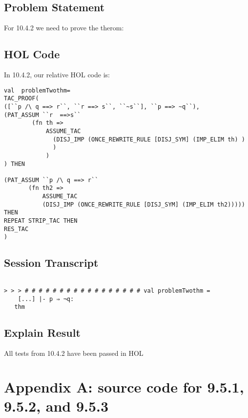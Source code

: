 \documentclass{report}
\begin{document}
\section{Problem Statement}
\label{Problem State 1042}
For 10.4.2 we need to prove the therom:




\section{HOL Code}
\label{HOl Code 1042}
In 10.4.2, our relative HOL code is:
\begin{lstlisting}[frame=trBL]
val  problemTwothm=
TAC_PROOF(
([``p /\ q ==> r``, ``r ==> s``, ``~s``], ``p ==> ~q``),
(PAT_ASSUM ``r  ==>s``
	    (fn th =>
     	    ASSUME_TAC
     	      (DISJ_IMP (ONCE_REWRITE_RULE [DISJ_SYM] (IMP_ELIM th) )
              )
            )
) THEN

(PAT_ASSUM ``p /\ q ==> r``
	   (fn th2 =>
     	   ASSUME_TAC
     	   (DISJ_IMP (ONCE_REWRITE_RULE [DISJ_SYM] (IMP_ELIM th2))))) THEN
REPEAT STRIP_TAC THEN
RES_TAC
)
\end{lstlisting}

\section{Session Transcript}
\label{Session Trans 1041}
\setcounter{sessioncount}{0}
\begin{session}
  \begin{scriptsize}
\begin{verbatim}

> > > # # # # # # # # # # # # # # # # # val problemTwothm =
    [...] |- p ⇒ ¬q:
   thm
\end{verbatim}
  \end{scriptsize}
\end{session}
\section{Explain Result}
\label{explain result 1042}
All tests from 10.4.2 have been passed in HOL


\chapter{Appendix A: source code for 9.5.1, 9.5.2, and 9.5.3}


%
\end{document}
